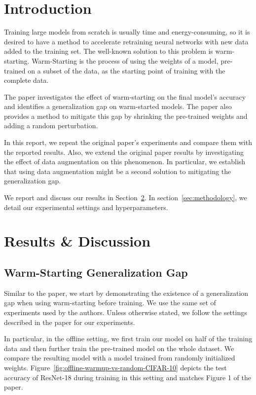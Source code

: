 
\section{Introduction}
Training large models from scratch is usually time and energy-consuming, so it is desired to have a method to accelerate retraining neural networks with new data added to the training set. The well-known solution to this problem is warm-starting.
Warm-Starting is the process of using the weights of a model, pre-trained on a subset of the data, as the starting point of training with the complete data. 

The paper investigates the effect of warm-starting on the final model's accuracy and identifies a generalization gap on warm-started models. The paper also provides a method to mitigate this gap by shrinking the pre-trained weights and adding a random perturbation. 

In this report, we repeat the original paper's experiments and compare them with the reported results. Also, we extend the original paper results by investigating the effect of data augmentation on this phenomenon. In particular, we establish that using data augmentation might be a second solution to mitigating the generalization gap.

We report and discuss our results in Section~\ref{sec:results-and-discussion}. In section~\ref{sec:methodology}, we detail our experimental settings and hyperparameters. 


\section{Results \& Discussion}
\label{sec:results-and-discussion}

\subsection{Warm-Starting Generalization Gap}
Similar to the paper, we start by demonstrating the existence of a generalization gap when using warm-starting before training. We use the same set of experiments used by the authors. Unless otherwise stated, we follow the settings described in the paper for our experiments. 

In particular, in the offline setting, we first train our model on half of the training data and then further train the pre-trained model on the whole dataset. We compare the resulting model with a model trained from randomly initialized weights. Figure~\ref{fig:offline-warmup-vs-random-CIFAR-10} depicts the test accuracy of ResNet-18 \cite{he_deep_2016} during training in this setting and matches Figure 1 of the paper. 


